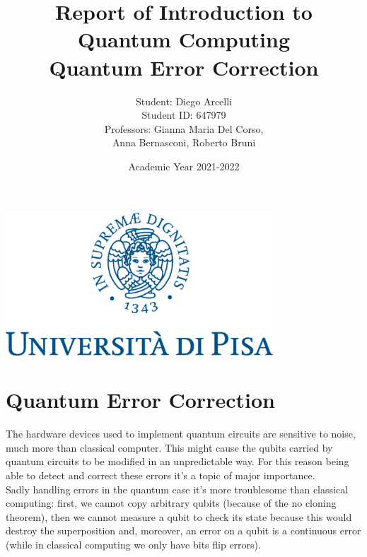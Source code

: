 \documentclass{article}
\begin{document}
	
	\begin{titlepage}
		
		\title{Report of Introduction to Quantum Computing \\ Quantum Error Correction}
		\author{Student: Diego Arcelli\\ Student ID: 647979 \\
			Professors: Gianna Maria Del Corso,\\Anna Bernasconi, Roberto Bruni}
		\date{Academic Year 2021-2022}
		\maketitle
		\centering
		\includegraphics[width=10cm]{./images/unipi_logo.png}
		
	\end{titlepage}
	\tableofcontents
	\newpage
	
	\section{Quantum Error Correction}
	 
	The hardware devices used to implement quantum circuits are sensitive to noise, much more than classical computer. This might cause the qubits carried by quantum circuits to be modified in an unpredictable way. For this reason being able to detect and correct these errors it's a topic of major importance. \\
	Sadly handling errors in the quantum case it's more troublesome than classical computing: first, we cannot copy arbitrary qubits (because of the no cloning theorem), then we cannot measure a qubit to check its state because this would destroy the superposition and, moreover, an error on a qubit is a continuous error (while in classical computing we only have bits flip errors).
	
\end{document}
